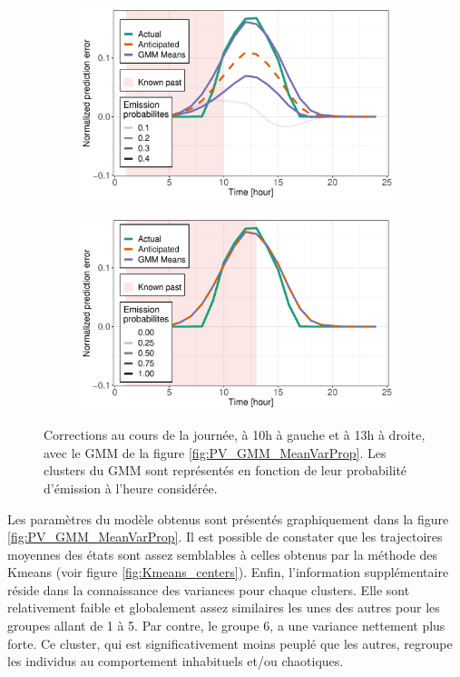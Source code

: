 \documentclass[12pt]{report}
\begin{document}
\begin{figure}[htbp]
	\begin{subfigure}[b]{0.5\linewidth}
		\centering
		\includegraphics[width=0.9\linewidth]{Images/PV/GMM/GMM_6Clust_Intraday_24d_10h_idtest336.pdf} 
	\end{subfigure}%
	\begin{subfigure}[b]{0.5\linewidth}
		\centering
		\includegraphics[width=0.9\linewidth]{Images/PV/GMM/GMM_6Clust_Intraday_24d_13h_idtest336.pdf}
	\end{subfigure}
		
	\caption{Corrections au cours de la journée, à 10h à gauche et à 13h à droite, avec le GMM de la figure \ref{fig:PV_GMM_MeanVarProp}. Les clusters du GMM sont représentés en fonction de leur probabilité d'émission à l'heure considérée. }
	\label{fig:PV_GMM_IntraDay} 
\end{figure}


Les paramètres du modèle obtenus sont présentés graphiquement dans la figure \ref{fig:PV_GMM_MeanVarProp}. Il est possible de constater que les trajectoires moyennes des états sont assez semblables à celles obtenus par la méthode des Kmeans (voir figure \ref{fig:Kmeans_centers}). Enfin, l'information supplémentaire réside dans la connaissance des variances pour chaque clusters. Elle sont relativement faible et globalement assez similaires les unes des autres pour les groupes allant de 1 à 5. Par contre, le groupe 6, a une variance nettement plus forte. Ce cluster, qui est significativement moins peuplé que les autres, regroupe les individus au comportement inhabituels et/ou chaotiques.
\end{document}
